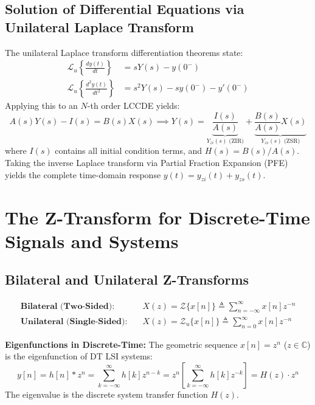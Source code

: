 \documentclass[12pt,a4paper]{article}
\begin{document}
\subsection{Solution of Differential Equations via Unilateral Laplace Transform}
The unilateral Laplace transform differentiation theorems state:
\begin{align}
  \mathcal{L}_u\left\{ \frac{dy(t)}{dt} \right\} &= s Y(s) - y(0^-) \\
  \mathcal{L}_u\left\{ \frac{d^2 y(t)}{dt^2} \right\} &= s^2 Y(s) - s y(0^-) - y'(0^-)
\end{align}
Applying this to an $N$-th order LCCDE yields:
\begin{equation}
  A(s) Y(s) - I(s) = B(s) X(s) \implies Y(s) = \underbrace{\frac{I(s)}{A(s)}}_{Y_{zi}(s) \text{ (ZIR)}} + \underbrace{\frac{B(s)}{A(s)} X(s)}_{Y_{zs}(s) \text{ (ZSR)}}
\end{equation}
where $I(s)$ contains all initial condition terms, and $H(s) = B(s)/A(s)$. Taking the inverse Laplace transform via Partial Fraction Expansion (PFE) yields the complete time-domain response $y(t) = y_{zi}(t) + y_{zs}(t)$.

\section{The Z-Transform for Discrete-Time Signals and Systems}

\subsection{Bilateral and Unilateral Z-Transforms}

\begin{tcolorbox}[defbox, title={\textbf{Definition: Bilateral vs Unilateral Z-Transform}}]
\begin{align}
  \textbf{Bilateral (Two-Sided):} \quad &X(z) = \mathcal{Z}\{x[n]\} \triangleq \sum_{n=-\infty}^{\infty} x[n] z^{-n} \\
  \textbf{Unilateral (Single-Sided):} \quad &X(z) = \mathcal{Z}_u\{x[n]\} \triangleq \sum_{n=0}^{\infty} x[n] z^{-n}
\end{align}
\end{tcolorbox}

\textbf{Eigenfunctions in Discrete-Time:}
The geometric sequence $x[n] = z^n$ ($z \in \mathbb{C}$) is the eigenfunction of DT LSI systems:
\begin{equation}
  y[n] = h[n] * z^n = \sum_{k=-\infty}^{\infty} h[k] z^{n-k} = z^n \left[ \sum_{k=-\infty}^{\infty} h[k] z^{-k} \right] = H(z) \cdot z^n
\end{equation}
The eigenvalue is the discrete system transfer function $H(z)$.
\end{document}
